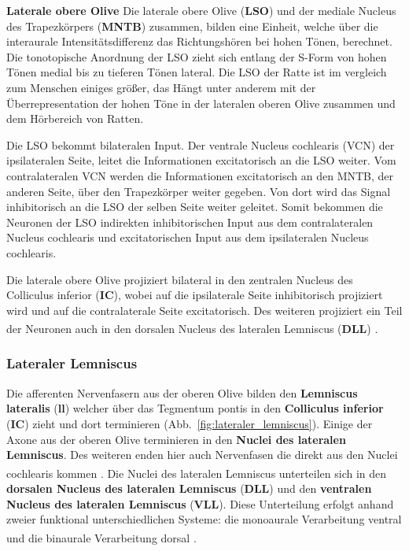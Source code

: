 \documentclass[12pt,a4paper,pdftex]{article}
\begin{document}
\newpage
\textbf{Laterale obere Olive}
\noindent Die laterale obere Olive (\textbf{LSO}) und der mediale Nucleus des Trapezkörpers (\textbf{MNTB}) zusammen, bilden eine Einheit, welche über die interaurale Intensitätsdifferenz das Richtungshören bei hohen Tönen, berechnet. 
 Die tonotopische Anordnung der LSO zieht sich entlang der S-Form von hohen Tönen medial bis zu tieferen Tönen lateral. Die LSO der Ratte ist im vergleich zum Menschen einiges größer, das Hängt unter anderem mit der Überrepresentation der hohen Töne in der lateralen oberen Olive zusammen und dem Hörbereich von Ratten.

Die LSO bekommt bilateralen Input. Der ventrale Nucleus cochlearis (VCN) der ipsilateralen Seite, leitet die Informationen excitatorisch an die LSO weiter. Vom contralateralen VCN werden die Informationen excitatorisch an den MNTB, der anderen Seite, über den Trapezkörper weiter gegeben. Von dort wird das Signal inhibitorisch an die LSO der selben Seite weiter geleitet.
Somit bekommen die Neuronen der LSO indirekten inhibitorischen Input aus dem contralateralen Nucleus cochlearis und excitatorischen Input aus dem ipsilateralen Nucleus cochlearis.

Die laterale obere Olive projiziert bilateral in den zentralen Nucleus des Colliculus inferior (\textbf{IC}), wobei auf die ipsilaterale Seite inhibitorisch projiziert wird und auf die contralaterale Seite excitatorisch.
Des weiteren projiziert ein Teil der Neuronen auch in den dorsalen Nucleus des lateralen Lemniscus (\textbf{DLL}) \textsuperscript{\cite[29]{paxinos2014rat}}.


\subsubsection*{Lateraler Lemniscus}
Die afferenten Nervenfasern aus der oberen Olive bilden den \textbf{Lemniscus lateralis} (\textbf{ll}) welcher über das Tegmentum pontis in den \textbf{Colliculus inferior} (\textbf{IC})  zieht und dort terminieren (Abb.~\ref{fig:lateraler_lemniscus}). Einige der Axone aus der oberen Olive terminieren in den \textbf{Nuclei des lateralen Lemniscus}. Des weiteren enden hier auch Nervenfasen die direkt aus den Nuclei cochlearis kommen \textsuperscript{\cite[10]{crossman2014neuroanatomy}}. 
Die Nuclei des lateralen Lemniscus unterteilen sich in den \textbf{dorsalen Nucleus des lateralen Lemniscus} (\textbf{DLL})  und den \textbf{ventralen Nucleus des lateralen Lemniscus} (\textbf{VLL}).  Diese Unterteilung erfolgt anhand zweier funktional unterschiedlichen Systeme: die monoaurale Verarbeitung ventral und die binaurale Verarbeitung dorsal \textsuperscript{\cite[29]{paxinos2014rat}}. 
\\
\end{document}
